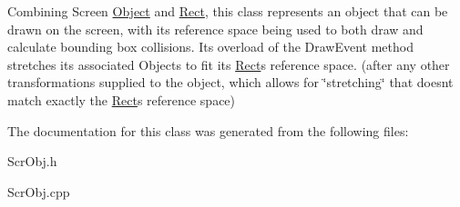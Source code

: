 Combining Screen \hyperlink{class_object}{Object} and \hyperlink{class_rect}{Rect}, this class represents an object that can be drawn on the screen, with its reference space being used to both draw and calculate bounding box collisions. Its overload of the Draw\+Event method stretches its associated Objects to fit its \hyperlink{class_rect}{Rect}\textquotesingle{}s reference space. (after any other transformations supplied to the object, which allows for \char`\"{}stretching\char`\"{} that doesn\textquotesingle{}t match exactly the \hyperlink{class_rect}{Rect}\textquotesingle{}s reference space) 

The documentation for this class was generated from the following files\+:\begin{DoxyCompactItemize}
\item 
Scr\+Obj.\+h\item 
Scr\+Obj.\+cpp\end{DoxyCompactItemize}

